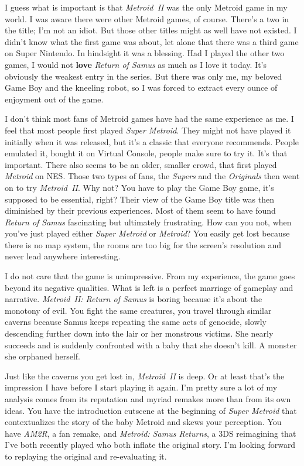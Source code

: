\documentclass{book}
\begin{document}
I guess what is important is that \emph{Metroid~II} was the only Metroid game in my world. I was aware there were other Metroid games, of course. There’s a two in the title; I’m not an idiot. But those other titles might as well have not existed. I didn’t know what the first game was about, let alone that there was a third game on Super Nintendo. In hindsight it was a blessing. Had I played the other two games, I would not \textbf{love} \emph{Return of Samus} as much as I love it today. It’s obviously the weakest entry in the series. But there was only me, my beloved Game Boy and the kneeling robot, so I was forced to extract every ounce of enjoyment out of the game.

I don’t think most fans of Metroid games have had the same experience as me. I feel that most people first played \emph{Super Metroid}. They might not have played it initially when it was released, but it’s a classic that everyone recommends. People emulated it, bought it on Virtual Console, people make sure to try it. It’s that important. There also seems to be an older, smaller crowd, that first played \emph{Metroid} on NES. Those two types of fans, the \emph{Supers} and the \emph{Originals} then went on to try \emph{Metroid~II}. Why not? You have to play the Game Boy game, it’s supposed to be essential, right? Their view of the Game Boy title was then diminished by their previous experiences. Most of them seem to have found \emph{Return of Samus} fascinating but ultimately frustrating. How can you not, when you’ve just played either \emph{Super Metroid} or \emph{Metroid}? You easily get lost because there is no map system, the rooms are too big for the screen’s resolution and never lead anywhere interesting.

I do not care that the game is unimpressive. From my experience, the game goes beyond its negative qualities. What is left is a perfect marriage of gameplay and narrative. \emph{Metroid~II: Return of Samus} is boring because it’s about the monotony of evil. You fight the same creatures, you travel through similar caverns because Samus keeps repeating the same acts of genocide, slowly descending further down into the lair or her monstrous victims. She nearly succeeds and is suddenly confronted with a baby that she doesn’t kill. A monster she orphaned herself.

Just like the caverns you get lost in, \emph{Metroid~II} is deep. Or at least that’s the impression I have before I start playing it again. I’m pretty sure a lot of my analysis comes from its reputation and myriad remakes more than from its own ideas. You have the introduction cutscene at the beginning of \emph{Super Metroid} that contextualizes the story of the baby Metroid and skews your perception. You have \emph{AM2R}, a fan remake, and \emph{Metroid: Samus Returns}, a 3DS reimagining that I’ve both recently played who both inflate the original story. I’m looking forward to replaying the original and re-evaluating it.
\end{document}
